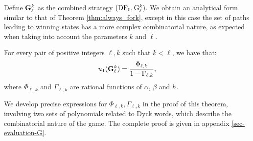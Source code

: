 Define ${\rm {\bf G}}_\ell^k$ as the combined strategy $(\text{\rm DF}_0, {\rm {G}}_\ell^k)$. We obtain an analytical form similar to that of Theorem \ref{thm:always_fork}, except in 
this case the set of paths leading to winning states has a more complex combinatorial nature, as expected when taking into account the 
parameters $k$ and $\ell$.
\begin{theorem}\label{thm-dificil}
For every pair of positive integers $\ell, k$ such that $k< \ell$, we have that:
$$u_1({\rm {\bf G}}^k_\ell) = \frac{\Phi_{\ell,k}}{1-\Gamma_{\ell,k}},$$
where $\Phi_{\ell,k}$ and $\Gamma_{\ell,k}$ are rational functions of $\alpha$, $\beta$ and $h$.%
\end{theorem}
We develop precise expressions for $\Phi_{\ell, k},\Gamma_{\ell,k}$ in the
proof of this theorem,
 involving two sets
of polynomials related to Dyck words, which describe the combinatorial nature of
the game. The complete proof is given in appendix \ref{sec-evaluation-G}.


